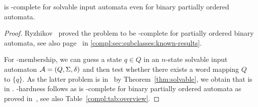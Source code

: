 \begin{theorem}\label{thm:SF-solvable}
	\SFS is \NP-complete for solvable input automata even for binary partially ordered automata.
\end{theorem} 
\begin{proof}
	Ryzhikov~\cite[Thm.~4]{Ryzhikov19a} proved the problem to be \NP-complete
	for partially ordered binary automata, see also page~\pageref{prelim:classes:intro:SFS} 
	in \cref{compl:sec:subclasses:known-results}.
	
	For \NP-membership, we can guess a state $q \in Q$ in an $n$-state solvable 
	input automaton $\mathcal A = (Q, \Sigma, \delta)$
	and then test whether 
	there exists a word mapping $Q$ to $\{q\}$.
	As the latter problem is in \NP\  by Theorem~\ref{thm:solvable},
	we obtain that \SFS is in \NP. 
	\NP-hardness follows as \SFS
	is \NP-complete for binary partially ordered automata
	as proved in~\cite[Thm.~4]{Ryzhikov19a}, 
	see also Table~\ref{compl:tab:overview}.
\end{proof}

